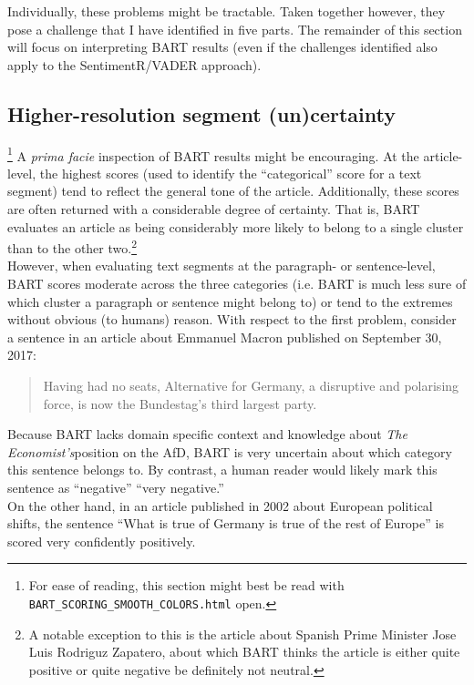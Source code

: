 \documentclass[11pt, letterpaper, twoside]{article}
\begin{document}
    Individually, these problems might be tractable. Taken together however, they pose a challenge that I have identified in five parts. The remainder of this section will focus on interpreting BART results (even if the challenges identified also apply to the SentimentR/VADER approach).
    
    \subsection{Higher-resolution segment (un)certainty}\footnote{For ease of reading, this section might best be read with \texttt{BART\_SCORING\_SMOOTH\_COLORS.html} open.}
        A \textit{prima facie} inspection of BART results might be encouraging. At the article-level, the highest scores (used to identify the ``categorical'' score for a text segment) tend to reflect the general tone of the article. Additionally, these scores are often returned with a considerable degree of certainty. That is, BART evaluates an article as being considerably more likely to belong to a single cluster than to the other two.\footnote{A notable exception to this is the article about Spanish Prime Minister Jose Luis Rodriguz Zapatero, about which BART thinks the article is either quite positive or quite negative be definitely not neutral.}\\

        However, when evaluating text segments at the paragraph- or sentence-level, BART scores moderate across the three categories (i.e. BART is much less sure of which cluster a paragraph or sentence might belong to) or tend to the extremes without obvious (to humans) reason. With respect to the first problem, consider a sentence in an article about Emmanuel Macron published on September 30, 2017:
        
        \begin{quote}
            Having had no seats, Alternative for Germany, a disruptive and polarising force, is now the Bundestag's third largest party.
        \end{quote}

        Because BART lacks domain specific context and knowledge about \textit{The Economist's}position on the AfD, BART is very uncertain about which category this sentence belongs to. By contrast, a human reader would likely mark this sentence as ``negative'' ``very negative.''\\

        On the other hand, in an article published in 2002 about European political shifts, the sentence ``What is true of Germany is true of the rest of Europe'' is scored very confidently positively.\\
\end{document}
